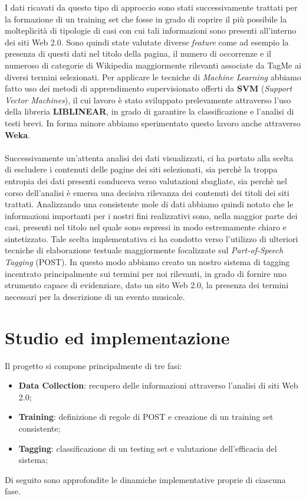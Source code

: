 \documentclass[a4paper]{report}
\begin{document}
I dati ricavati da questo tipo di approccio sono stati successivamente trattati per la formazione di un training set che fosse in grado di coprire  il più possibile la molteplicità di tipologie di casi con cui tali informazioni sono presenti all'interno dei siti Web 2.0. Sono quindi state valutate diverse \textit{feature} come ad esempio la presenza di questi dati nel titolo della pagina, il numero di occorrenze e il numeroso di categorie di Wikipedia maggiormente rilevanti associate da TagMe ai diversi termini selezionati. Per applicare le tecniche di \textit{Machine Learning} abbiamo fatto uso dei metodi di apprendimento supervisionato offerti da \textbf{SVM} (\textit{Support Vector Machines}), il cui lavoro è stato sviluppato prelevamente attraverso l'uso della libreria \textbf{LIBLINEAR}\cite{4}, in grado di garantire la classificazione e l'analisi di testi brevi. In forma minore abbiamo sperimentato questo lavoro anche attraverso \textbf{Weka}\cite{5}. \\
\\
Successivamente un'attenta analisi dei dati visualizzati, ci ha portato alla scelta di escludere i contenuti delle pagine dei siti selezionati, sia perchè la troppa entropia dei dati presenti conduceva verso valutazioni sbagliate, sia perchè nel corso dell'analisi è emersa una decisiva rilevanza dei contenuti dei titoli dei siti trattati. Analizzando una consistente mole di dati abbiamo quindi notato che le informazioni importanti per i nostri fini realizzativi sono, nella maggior parte dei casi, presenti nel titolo nel quale sono espressi in modo estremamente chiaro e sintetizzato. Tale scelta implementativa ci ha condotto verso l'utilizzo di ulteriori tecniche di elaborazione testuale maggiormente focalizzate sul \textit{Part-of-Speech Tagging} (POST). In questo modo abbiamo creato un nostro sistema di tagging incentrato principalmente sui termini per noi rilevanti, in grado di fornire uno strumento capace di evidenziare, dato un sito Web 2.0, la presenza dei termini necessari per la descrizione di un evento musicale. 

\chapter{Studio ed implementazione}
Il progetto si compone principalmente di tre fasi:
\begin{itemize}
\item \textbf{Data Collection}: recupero delle informazioni attraverso l'analisi di siti Web 2.0;
\item \textbf{Training}: definizione di regole di POST e creazione di un training set consistente;
\item \textbf{Tagging}: classificazione di un testing set e valutazione dell'efficacia del sistema;
\end{itemize}
Di seguito sono approfondite le dinamiche implementative proprie di ciascuna fase.
\end{document}
